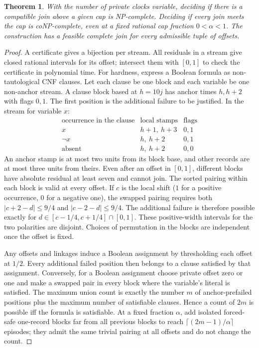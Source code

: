 \documentclass[11pt]{article}
\newtheorem{theorem}{Theorem}
\begin{document}
\begin{theorem}
With the number of private clocks variable, deciding if there is a
compatible join above a given cap is NP-complete. Deciding if every
join meets the cap is coNP-complete, even at a fixed rational cap
fraction \(0<\alpha<1\). The construction has a feasible complete
join for every admissible tuple of offsets.
\end{theorem}
\begin{proof}
A certificate gives a bijection per stream. All residuals in a
stream give closed rational intervals for its offset; intersect
them with \([0,1]\) to check the certificate in polynomial time.
For hardness, express a Boolean formula as non-tautological CNF
clauses. Let each clause be one block and each variable be one
non-anchor stream. A clause block based at \(h=10j\) has anchor
times \(h,h+2\) with flags \(0,1\). The first position is the
additional failure to be justified. In the stream for variable \(x\):
\[
\begin{array}{c|c|c}
  \text{occurrence in the clause} & \text{local stamps} & \text{flags}\\
  \hline
  x & h+1,\ h+3 & 0,1\\
  \neg x & h,\ h+2 & 0,1\\
  \text{absent} & h,\ h+2 & 0,0
\end{array}
\]
An anchor stamp is at most two units from its block base, and
other records are at most three units from theirs. Even after
an offset in \([0,1]\), different blocks have absolute residual
at least seven and cannot join. The sorted pairing within each
block is valid at every offset. If \(c\) is the local shift
(\(1\) for a positive occurrence, \(0\) for a negative one),
the swapped pairing requires both
\(|c+2-d|\le9/4\) and \(|c-2-d|\le9/4\). The additional
failure is therefore possible exactly for
\(d\in[c-1/4,c+1/4]\cap[0,1]\). These positive-width intervals
for the two polarities are disjoint. Choices of permutation
in the blocks are independent once the offset is fixed.

Any offsets and linkages induce a Boolean assignment by thresholding
each offset at \(1/2\). Every additional failed position then
belongs to a clause satisfied by that assignment. Conversely, for
a Boolean assignment choose private offset zero or one and make
a swapped pair in every block where the variable's literal is
satisfied. The maximum union count is exactly the number \(m\)
of anchor-prefailed positions plus the maximum number of satisfiable
clauses. Hence a count of \(2m\) is possible iff the formula is
satisfiable. At a fixed fraction \(\alpha\), add isolated forced-safe
one-record blocks far from all previous blocks to reach
\(\lceil(2m-1)/\alpha\rceil\) episodes; they admit the same trivial
pairing at all offsets and do not change the count.
\end{proof}
\end{document}
